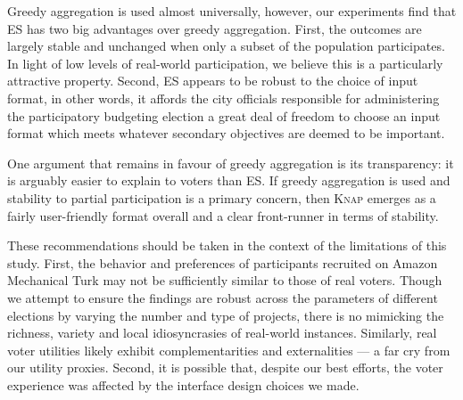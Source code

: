 \documentclass[letterpaper]{article} %
\newcommand{\knap}{\textsc{Knap}}
\newcommand{\mes}{ES}
\begin{document}
Greedy aggregation is used almost universally,  however, our experiments find that \mes{} has  two  big advantages over greedy aggregation.  First,  the outcomes are largely stable and unchanged when only a subset of the population participates. In light of low levels of real-world participation, we believe this is a particularly attractive property. Second, \mes{} appears to be robust to the choice of input format, in other words, it affords the city officials responsible for administering the participatory budgeting election a great deal of freedom to choose an input format which meets whatever secondary objectives are deemed to be important. %

One argument that remains in favour of greedy aggregation is its transparency: it is arguably easier to explain to voters than \mes{}. If greedy aggregation is used    and stability to partial participation is a primary concern, then \knap{} emerges as a fairly user-friendly format overall and a clear front-runner in terms of stability.

These recommendations should be taken in the context of the limitations of this study. First, the  behavior and preferences of participants recruited on Amazon Mechanical Turk may not be sufficiently similar to those of real voters.  Though we attempt to  ensure the findings are robust across the parameters of different elections by varying the number and type of projects, there is no mimicking the richness, variety and local idiosyncrasies of real-world instances. Similarly, real voter utilities likely exhibit complementarities and externalities  --- a far cry from our utility proxies. Second, it is possible that, despite our best efforts, the   voter experience   was affected by the interface design choices we made. 
\end{document}

